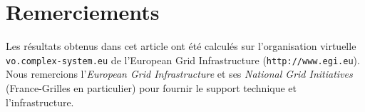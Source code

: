 \documentclass[11pt]{article}
\begin{document}




\section*{Remerciements}

Les résultats obtenus dans cet article ont été calculés sur l'organisation virtuelle \texttt{vo.complex-system.eu} de l'European Grid Infrastructure (\texttt{http://www.egi.eu}). Nous remercions l'\textit{European Grid Infrastructure} et ses \textit{National Grid Initiatives} (France-Grilles en particulier) pour fournir le support technique et l'infrastructure.











\end{document}

